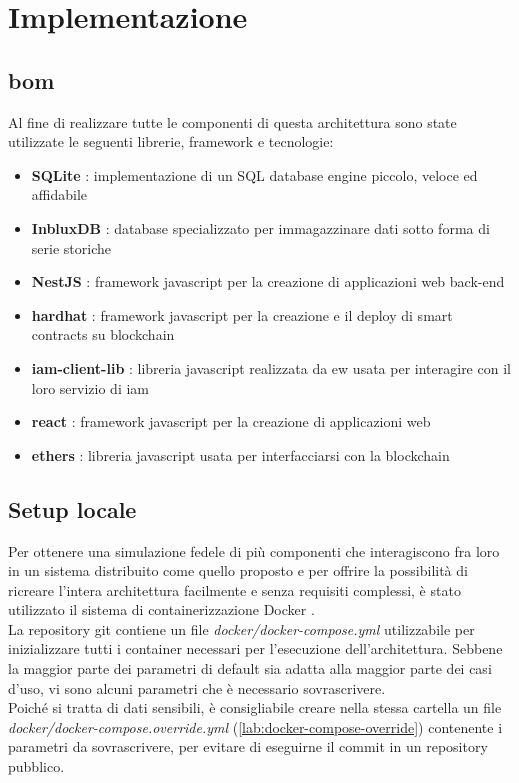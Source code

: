 
\section{Implementazione}

\subsection{\gls{bom}}
Al fine di realizzare tutte le componenti di questa architettura sono state utilizzate le seguenti librerie, framework e tecnologie:

\begin{itemize}
    \item \textbf{SQLite} \cite{sftw:sqlite}: implementazione di un SQL database engine piccolo, veloce ed affidabile
    \item \textbf{InbluxDB} \cite{sftw:influxdb}: database specializzato per immagazzinare dati sotto forma di serie storiche
    \item \textbf{NestJS} \cite{sftw:nestjs}: framework javascript per la creazione di applicazioni web back-end
    \item \textbf{hardhat} \cite{sftw:hardhat}: framework javascript per la creazione e il deploy di smart contracts su blockchain
    \item \textbf{iam-client-lib} \cite{sftw:iam-client-lib}: libreria javascript realizzata da \gls{ew} usata per interagire con il loro servizio di \gls{iam}
    \item \textbf{react} \cite{sftw:react}: framework javascript per la creazione di applicazioni web
    \item \textbf{ethers} \cite{sftw:ethers}: libreria javascript usata per interfacciarsi con la blockchain
\end{itemize}

\subsection{Setup locale}
Per ottenere una simulazione fedele di più componenti che interagiscono fra loro in un sistema distribuito come quello proposto e
per offrire la possibilità di ricreare l'intera architettura facilmente e senza requisiti complessi, è stato utilizzato il sistema di containerizzazione Docker \cite{sftw:docker}. \\
La repository git contiene un file \textit{docker/docker-compose.yml} utilizzabile per inizializzare tutti i container necessari per l'esecuzione dell'architettura.
Sebbene la maggior parte dei parametri di default sia adatta alla maggior parte dei casi d'uso, vi sono alcuni parametri che è necessario sovrascrivere. \\
Poiché si tratta di dati sensibili, è consigliabile creare nella stessa cartella un file \textit{docker/docker-compose.override.yml} (\autoref{lab:docker-compose-override}) contenente i parametri da sovrascrivere,
per evitare di eseguirne il commit in un repository pubblico.

